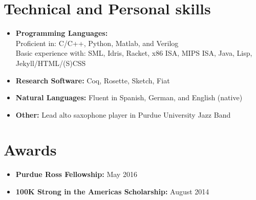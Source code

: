 \documentclass[10pt,a4paper,sans]{moderncv}        %
\begin{document}
\section{Technical and Personal skills}

\vspace{4pt}

\begin{itemize}

\item \textbf{Programming Languages:} \\
  Proficient in: C/C++, Python, Matlab, and Verilog \\ Basic experience with: SML, Idris, Racket,
  x86 ISA, MIPS ISA, Java, Lisp, Jekyll/HTML/(S)CSS

\vspace{4pt}

\item \textbf{Research Software:} Coq, Rosette, Sketch, Fiat

\vspace{4pt}

\item \textbf{Natural Languages:} Fluent in Spanish, German, and English (native)

\vspace{4pt}

\item \textbf{Other:} Lead alto saxophone player in Purdue University
  Jazz Band

\end{itemize}

\section{Awards}

\vspace{4pt}

\begin{itemize}


\item \textbf{Purdue Ross Fellowship:} May 2016
\vspace{4pt}
\item \textbf{100K Strong in the Americas Scholarship:} August 2014

\end{itemize}


\nocite{*}

\end{document}
